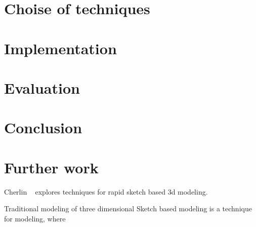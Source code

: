 \documentclass[a4paper,10pt]{article}
\begin{document}
\section{Choise of techniques}

\section{Implementation}

\section{Evaluation}

\section{Conclusion}

\section{Further work}


Cherlin ~\cite{Cherlin:2005:SMF:1090122.1090145} explores techniques for rapid sketch based 3d modeling.

Traditional modeling of three dimensional 
Sketch based modeling is a technique for modeling, where 

{}

\end{document}
